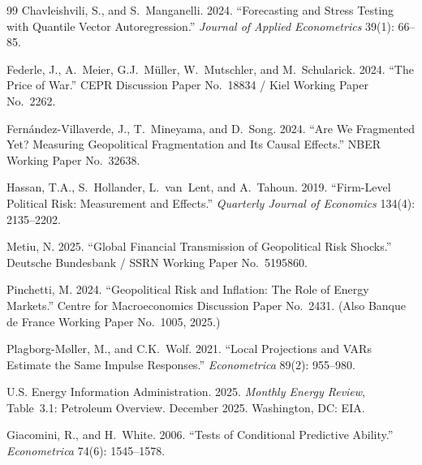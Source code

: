 \documentclass[12pt]{article}
\begin{document}
\begin{thebibliography}{99}
Chavleishvili, S., and S.~Manganelli. 2024.
``Forecasting and Stress Testing with Quantile Vector Autoregression.''
\textit{Journal of Applied Econometrics} 39(1): 66--85.

Federle, J., A.~Meier, G.J.~M\"{u}ller, W.~Mutschler, and M.~Schularick. 2024.
``The Price of War.''
CEPR Discussion Paper No.~18834 / Kiel Working Paper No.~2262.

Fern\'{a}ndez-Villaverde, J., T.~Mineyama, and D.~Song. 2024.
``Are We Fragmented Yet? Measuring Geopolitical Fragmentation and Its
Causal Effects.'' NBER Working Paper No.~32638.

Hassan, T.A., S.~Hollander, L.~van~Lent, and A.~Tahoun. 2019.
``Firm-Level Political Risk: Measurement and Effects.''
\textit{Quarterly Journal of Economics} 134(4): 2135--2202.

Metiu, N. 2025.
``Global Financial Transmission of Geopolitical Risk Shocks.''
Deutsche Bundesbank / SSRN Working Paper No.~5195860.

Pinchetti, M. 2024.
``Geopolitical Risk and Inflation: The Role of Energy Markets.''
Centre for Macroeconomics Discussion Paper No.~2431.
(Also Banque de France Working Paper No.~1005, 2025.)

Plagborg-M{\o}ller, M., and C.K.~Wolf. 2021.
``Local Projections and VARs Estimate the Same Impulse Responses.''
\textit{Econometrica} 89(2): 955--980.




U.S. Energy Information Administration. 2025.
\textit{Monthly Energy Review}, Table~3.1: Petroleum Overview.
December 2025. Washington, DC: EIA.

Giacomini, R., and H.~White. 2006.
``Tests of Conditional Predictive Ability.''
\textit{Econometrica} 74(6): 1545--1578.

\end{thebibliography}
\end{document}
